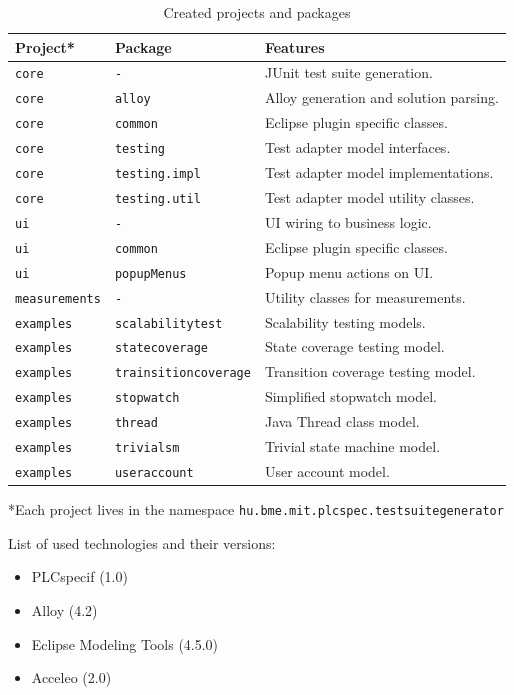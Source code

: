 \begin{table}[htb]
\begin{center}
\begin{tabular}{p{3cm}p{4.5cm}p{6.5cm}}
\toprule
	\textbf{Project*} & \textbf{Package} & \textbf{Features}\\\midrule
	\texttt{core} & \texttt{-} & JUnit test suite generation.\\
	\texttt{core} & \texttt{alloy} & Alloy generation and solution parsing.\\
	\texttt{core} & \texttt{common} & Eclipse plugin specific classes.\\
	\texttt{core} & \texttt{testing} & Test adapter model interfaces.\\
	\texttt{core} & \texttt{testing.impl} & Test adapter model implementations.\\
	\texttt{core} & \texttt{testing.util} & Test adapter model utility classes.\\
	\texttt{ui} & \texttt{-} & UI wiring to business logic.\\
	\texttt{ui} & \texttt{common} & Eclipse plugin specific classes.\\
	\texttt{ui} & \texttt{popupMenus} & Popup menu actions on UI.\\
	\texttt{measurements} & \texttt{-} & Utility classes for measurements.\\
	\texttt{examples} & \texttt{scalabilitytest} & Scalability testing models.\\
	\texttt{examples} & \texttt{statecoverage} & State coverage testing model.\\
	\texttt{examples} & \texttt{trainsitioncoverage} & Transition coverage testing model.\\
	\texttt{examples} & \texttt{stopwatch} & Simplified stopwatch model.\\
	\texttt{examples} & \texttt{thread} & Java Thread class model.\\
	\texttt{examples} & \texttt{trivialsm} & Trivial state machine model.\\
	\texttt{examples} & \texttt{useraccount} & User account model.\\
\bottomrule
\end{tabular}
\end{center}
\begin{flushright}
\tiny{*Each project lives in the namespace \texttt{hu.bme.mit.plcspec.testsuitegenerator}}
\end{flushright}
\caption{\label{tab:hardwarespecification} Created projects and packages}
\end{table}

List of used technologies and their versions:

\begin{itemize}[noitemsep,topsep=0pt,parsep=0pt,partopsep=0pt]
	\item PLCspecif (1.0)
	\item Alloy (4.2)
	\item Eclipse Modeling Tools (4.5.0)
	\item Acceleo (2.0)
\end{itemize}


